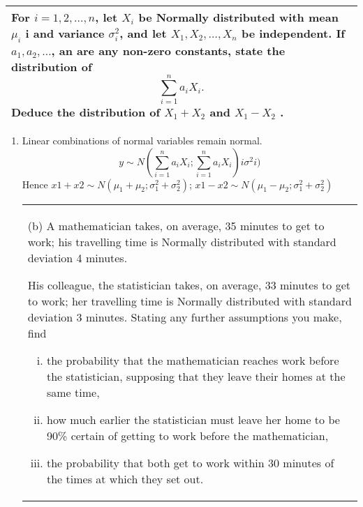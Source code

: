 \documentclass[a4paper,12pt]{article}
\begin{document}
\begin{table}[ht!]
     \centering
     \begin{tabular}{|p{15cm}|}
     \hline        
     \large
For $i = 1, 2, \ldots, n$, let $X_i$ be Normally distributed with mean $\mu_i$ i and variance $\sigma^2_i$, and let $X_1, X_2, \ldots, X_n$ be independent.  If $a_1, a_2, \ldots$, an are any 
non-zero constants, state the distribution of 
\[  \sum^{n}_{i=1} a_iX_i. \] 
Deduce the  distribution of $X_1 + X_2$ and $X_1 - X_2$ . 
 \\ \hline
      \end{tabular}
    \end{table}
    

    

\begin{enumerate}
    \item 
Linear combinations of normal variables remain normal.
\[
y \sim N( \sum^{n}_{i=1} a_iX_i;  \sum^{n}_{i=1} a_iX_i)
i \sigma^2
i )\]
Hence $x1 + x2 \sim N(\mu_1 + \mu_2; \sigma^2_1 + \sigma^2_2)$; $x1 - x2 \sim N(\mu_1 - \mu_2; \sigma^2_1 + \sigma^2_2)$
\newpage
  \begin{table}[ht!]
     \centering
     \begin{tabular}{|p{15cm}|}
     \hline  
 \large
(b) A mathematician takes, on average, 35 minutes to get to work;  his travelling time is Normally distributed with standard deviation 4 minutes.  

His colleague, the statistician takes, on average, 33 minutes to get to work;  her travelling time is Normally distributed with standard deviation 3 minutes.  Stating any further assumptions you make, find 
 
\begin{enumerate}[(i)] 
\item the probability that the mathematician reaches work before the statistician, supposing that they leave their homes at the same time, 
 
\item how much earlier the statistician must leave her home to be 90\% certain of getting to work before the mathematician, 
 
\item the probability that both get to work within 30 minutes of the times at which they set out. 
\end{enumerate}


\end{tabular}
\end{table}
\end{enumerate}
\end{document}
